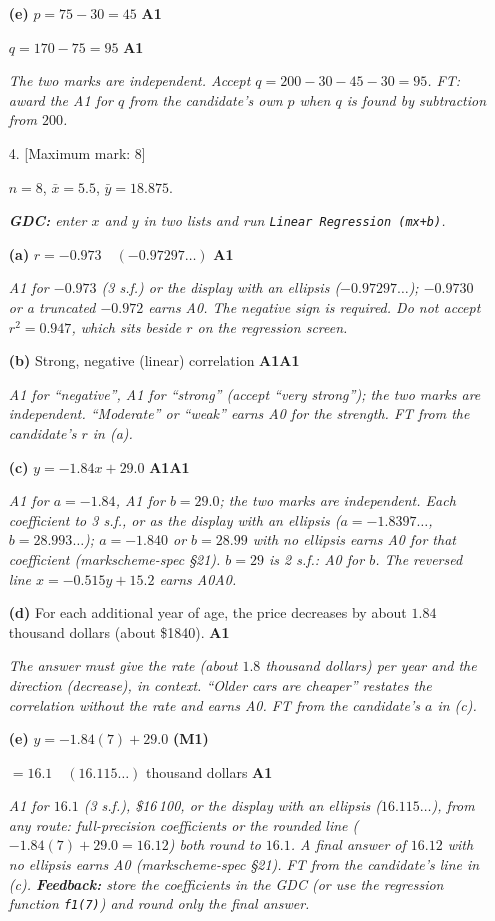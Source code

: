 \documentclass[12pt, twoside]{article}
\begin{document}
\begin{enumerate}[itemsep=0.3cm]
\textbf{(e)} $p = 75 - 30 = 45$ \hfill \textbf{A1}

$q = 170 - 75 = 95$ \hfill \textbf{A1}

\emph{The two marks are independent. Accept $q = 200 - 30 - 45 - 30 = 95$.
FT: award the A1 for $q$ from the candidate's own $p$ when $q$ is found by
subtraction from $200$.}

\newpage

\item[4.] [Maximum mark: 8]

$n = 8$, \quad $\bar{x} = 5.5$, \quad $\bar{y} = 18.875$.

\emph{\textbf{GDC:} enter $x$ and $y$ in two lists and run
\texttt{Linear Regression (mx+b)}.}

\textbf{(a)} $r = -0.973 \quad (-0.97297\ldots)$ \hfill \textbf{A1}

\emph{A1 for $-0.973$ (3 s.f.) or the display with an ellipsis
($-0.97297\ldots$); $-0.9730$ or a truncated $-0.972$ earns A0. The negative sign is required. Do not accept $r^{2} = 0.947$, which
sits beside $r$ on the regression screen.}

\textbf{(b)} Strong, negative (linear) correlation \hfill \textbf{A1A1}

\emph{A1 for ``negative'', A1 for ``strong'' (accept ``very strong''); the
two marks are independent. ``Moderate'' or ``weak'' earns A0 for the
strength. FT from the candidate's $r$ in (a).}

\textbf{(c)} $y = -1.84x + 29.0$ \hfill \textbf{A1A1}

\emph{A1 for $a = -1.84$, A1 for $b = 29.0$; the two marks are independent.
Each coefficient to 3 s.f., or as the display with an ellipsis ($a =
-1.8397\ldots$, $b = 28.993\ldots$); $a = -1.840$ or $b = 28.99$ with no
ellipsis earns A0 for that coefficient (markscheme-spec §21). $b = 29$ is 2 s.f.: A0 for $b$. The reversed line $x = -0.515y + 15.2$ earns A0A0.}

\textbf{(d)} For each additional year of age, the price decreases by about
$1.84$ thousand dollars (about \$1840). \hfill \textbf{A1}

\emph{The answer must give the rate (about $1.8$ thousand dollars) per year
and the direction (decrease), in context. ``Older cars are cheaper''
restates the correlation without the rate and earns A0. FT from the
candidate's $a$ in (c).}

\textbf{(e)} $y = -1.84(7) + 29.0$ \hfill \textbf{(M1)}

$= 16.1 \quad (16.115\ldots)$ thousand dollars \hfill \textbf{A1}

\emph{A1 for $16.1$ (3 s.f.), \$16\,100, or the display with an ellipsis
($16.115\ldots$), from any route: full-precision coefficients or the
rounded line ($-1.84(7) + 29.0 = 16.12$) both round to $16.1$. A final
answer of $16.12$ with no ellipsis earns A0 (markscheme-spec §21). FT from the
candidate's line in (c). \textbf{Feedback:} store the coefficients in the GDC
(or use the regression function \texttt{f1(7)}) and round only the final
answer.}

\end{enumerate}
\end{document}
